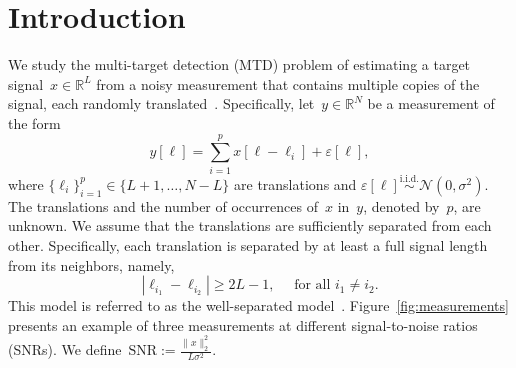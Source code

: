 \documentclass{article}
\begin{document}
\section{Introduction}
\label{sec:intro}
We study the multi-target detection (MTD) problem of estimating a target signal~$x \in \mathbb{R}^L$ from a noisy measurement that contains multiple copies of the signal, each randomly translated~\cite{bendory2019multi,lan2020multi,marshall2020image,bendory2021multi,kreymer2021two,bendory2018toward}. Specifically, let~$y \in \mathbb{R}^N$ be a measurement of the form
\begin{equation}
\label{eq:model}
y[\ell] = \sum_{i=1}^{p} x[\ell - \ell_i] + \varepsilon[\ell],
\end{equation}
where \mbox{$\{\ell_i\}_{i=1}^{p} \in \{L + 1, \ldots, N-L\}$} are translations and $\varepsilon[\ell]\overset{\text{i.i.d.}}{\sim} \mathcal{N}(0,\sigma^2)$. The translations and the number of occurrences of~$x$ in~$y$, denoted by~$p$, are unknown. {We assume that the translations are sufficiently separated from each other. Specifically}, each translation is separated by at least a full signal length from its neighbors, {namely},
\begin{equation}
	\label{eq:sep}
	|\ell_{i_1} - \ell_{i_2}| \ge 2L - 1, \quad \text{ for all } i_1 \ne i_2.
\end{equation}
{This model is referred to as the well-separated model~\cite{bendory2019multi}}. Figure~\ref{fig:measurements} presents an example of three  measurements at different signal-to-noise ratios (SNRs). We define~\mbox{$\text{SNR} := \frac{\|x\|_2^2}{L \sigma^2}$}.
\end{document}
